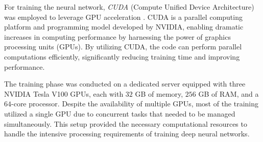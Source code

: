 For training the neural network, \textit{CUDA} (Compute Unified Device Architecture) was employed to leverage GPU acceleration \cite{cuda}. CUDA is a parallel computing platform and programming model developed by NVIDIA, enabling dramatic increases in computing performance by harnessing the power of graphics processing units (GPUs). By utilizing CUDA, the code can perform parallel computations efficiently, significantly reducing training time and improving performance.

The training phase was conducted on a dedicated server equipped with three NVIDIA Tesla V100 GPUs, each with $32$ GB of memory, $256$ GB of RAM, and a $64$-core processor. Despite the availability of multiple GPUs, most of the training utilized a single GPU due to concurrent tasks that needed to be managed simultaneously. This setup provided the necessary computational resources to handle the intensive processing requirements of training deep neural networks.